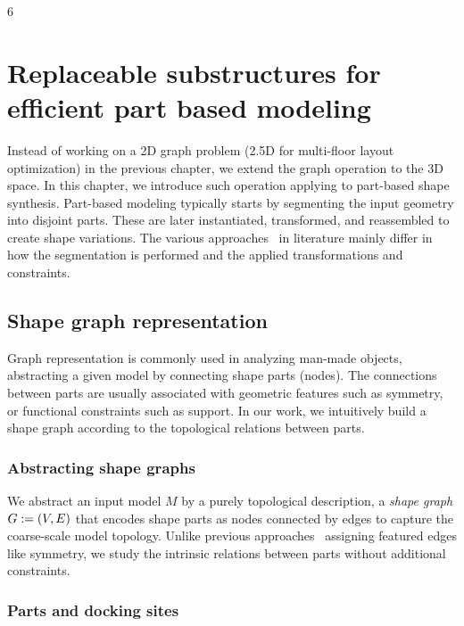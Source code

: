 6

\chapter{Replaceable substructures for efficient part based modeling}
\label{chapter4}

Instead of working on a 2D graph problem (2.5D for multi-floor layout optimization) in the previous chapter, we extend the graph operation to the 3D space. In this chapter, we introduce such operation applying to part-based shape synthesis. Part-based modeling typically starts by segmenting the input geometry into disjoint parts. These are later instantiated, transformed, and reassembled to create shape variations. The various approaches~\cite{MitraSTAR2013} in literature mainly differ in how the segmentation is performed and the applied transformations and constraints.

\section{Shape graph representation}

Graph representation is commonly used in analyzing man-made objects, abstracting a given model by connecting shape parts (nodes). The connections between parts are usually associated with geometric features such as symmetry, or functional constraints such as support. In our work, we intuitively build a shape graph according to the topological relations between parts.

\subsection{Abstracting shape graphs}

We abstract an input model $M$ by a purely topological description, a \emph{shape graph} $G := (V,E)$ that encodes shape parts as nodes connected by edges to capture the coarse-scale model topology. Unlike previous approaches~\cite{wang_eg11,topoVarying14} assigning featured edges like symmetry, we study the intrinsic relations between parts without additional constraints.

\subsection{Parts and docking sites}

